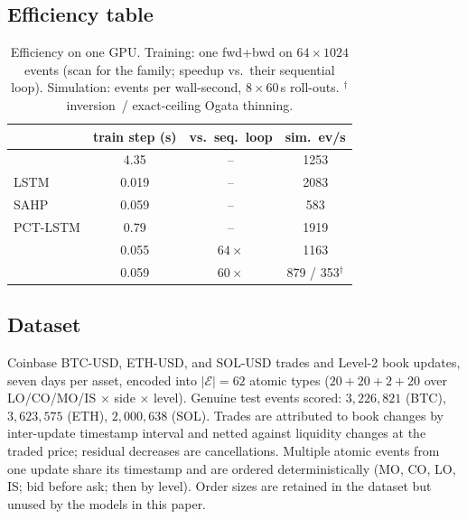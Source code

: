 \subsection{Efficiency table}
\begin{table}[t]
\centering
\small
\setlength{\tabcolsep}{4pt}
\begin{tabular}{lccc}
\toprule
 & train step (s) & vs.\ seq.\ loop & sim.\ ev/s\\
\midrule
\nhp{}    & 4.35  & --           & 1253\\
LSTM      & 0.019 & --           & 2083\\
SAHP      & 0.059 & --           & 583\\
PCT-LSTM  & 0.79  & --           & 1919\\
\spppu{}   & 0.055 & $64\times$   & 1163\\
\ssppp{}  & 0.059 & $60\times$   & 879 / 353$^{\dag}$\\
\bottomrule
\end{tabular}
\caption{Efficiency on one GPU. Training: one fwd+bwd on $64\times1024$
events (scan for the \sppp{} family; speedup vs.\ their sequential loop).
Simulation: events per wall-second, $8\times60$\,s roll-outs.
$^{\dag}$inversion~/ exact-ceiling Ogata thinning.}
\label{tab:speed}
\end{table}

\subsection{Dataset}
Coinbase BTC-USD, ETH-USD, and SOL-USD trades and Level-2 book updates,
seven days per asset, encoded into $|\mathcal{E}|=62$ atomic types
($20+20+2+20$ over LO/CO/MO/IS $\times$ side $\times$ level). Genuine test
events scored: $3{,}226{,}821$ (BTC), $3{,}623{,}575$ (ETH), $2{,}000{,}638$
(SOL). Trades are attributed to book changes by inter-update timestamp
interval and netted against liquidity changes at the traded price; residual
decreases are cancellations. Multiple atomic events from one update share
its timestamp and are ordered deterministically (MO, CO, LO, IS; bid before
ask; then by level). Order sizes are retained in the dataset but unused by
the models in this paper.
